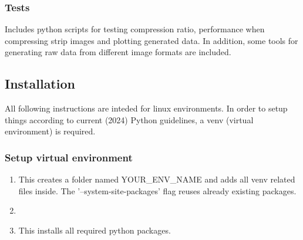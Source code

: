 \documentclass[12pt, a4paper]{article}
\begin{document}
\noindent
\subsubsection{Tests}
Includes python scripts for testing compression ratio, 
performance when compressing strip images and plotting generated data. 
In addition, some tools for generating raw data from different image formats are included. 

\newpage
\subsection{Installation}
All following instructions are inteded for linux environments. 
In order to setup things according to current (2024) Python guidelines, 
a venv (virtual environment) is required.

\subsubsection{Setup virtual environment}
\begin{enumerate}

    \item {}

        \medskip
        This creates a folder named YOUR\_ENV\_NAME and adds all venv related files inside. 
        The '--system-site-packages' flag reuses already existing packages.

    \medskip
    \item {}

    \medskip
    \item {}

        \medskip
        This installs all required python packages.
\end{enumerate}
\end{document}
